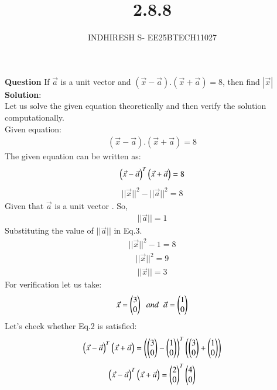 \documentclass[journal]{IEEEtran}
\theoremstyle{remark}
\begin{document}

\onecolumn

\title{2.8.8}
\author{INDHIRESH S- EE25BTECH11027}
\maketitle


\renewcommand{\thefigure}{\theenumi}
\renewcommand{\thetable}{\theenumi}

\textbf{Question} If $\vec{a}$ is a unit vector and $(\vec{x} -\vec{a}).(\vec{x}+\vec{a}) = 8$, then find $|\vec{x}|$\\
\textbf{Solution}:\\
Let us solve the given equation theoretically and then verify the solution computationally. \\
Given equation:
\begin{align}
     (\vec{x} -\vec{a}).(\vec{x}+\vec{a}) = 8
\end{align}
The given equation can be written as:
\begin{align}
   \begin{pmatrix}\Vec{x}-\Vec{a}\end{pmatrix}^T\begin{pmatrix}\Vec{x}+\Vec{a}\end{pmatrix}=8
\end{align}
\begin{align}
    ||\Vec{x}||^2-||\Vec{a}||^2=8
\end{align}
Given that $\Vec{a}$ is a unit vector . So,
\begin{align}
    ||\Vec{a}||=1
\end{align}
Substituting the value of $||\Vec{a}||$ in Eq.3.
\begin{align}
    ||\Vec{x}||^2-1=8
\end{align}
\begin{align}
    ||\Vec{x}||^2=9
\end{align}
\begin{align}
     ||\Vec{x}||=3
\end{align}
For verification let us take:
\begin{align}
    \Vec{x}=\begin{pmatrix}3\\0\end{pmatrix}\;\;and\;\;\Vec{a}=\begin{pmatrix}1\\0\end{pmatrix}
\end{align}
Let's check whether Eq.2 is satisfied:
\begin{align}
\begin{pmatrix}\Vec{x}-\Vec{a}\end{pmatrix}^T\begin{pmatrix}\Vec{x}+\Vec{a}\end{pmatrix}= \left(\begin{pmatrix}3\\0\end{pmatrix}-\begin{pmatrix}1\\0\end{pmatrix}\right)^T\left(\begin{pmatrix}3\\0\end{pmatrix}+\begin{pmatrix}1\\0\end{pmatrix}\right)
\end{align}
\begin{align}
    \begin{pmatrix}\Vec{x}-\Vec{a}\end{pmatrix}^T\begin{pmatrix}\Vec{x}+\Vec{a}\end{pmatrix}= \begin{pmatrix}2\\0\end{pmatrix}^T\begin{pmatrix}4\\0\end{pmatrix}
\end{align}
\end{document}
